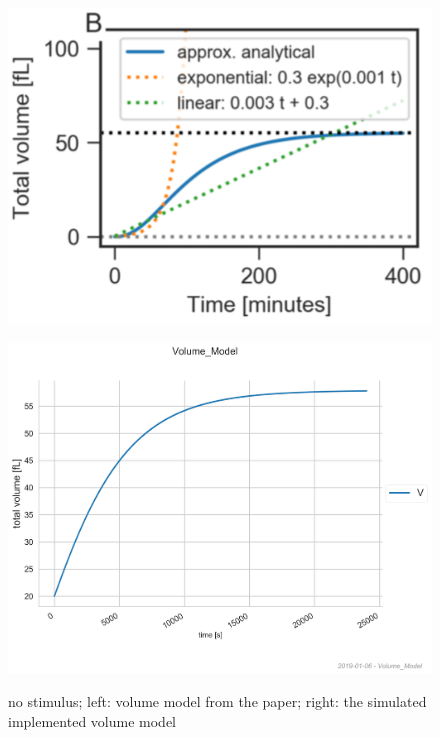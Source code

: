 \begin{figure}[htbp]
	
	\begin{minipage}{0,5\textwidth}
		
		\includegraphics[width=\textwidth]{picture/Volume_Paper.png}
		
		\label{volumePaper} 
	\end{minipage}
	\begin{minipage}{0,5\textwidth}
		
		\includegraphics[width=\textwidth]{picture/volume_examine.png}
		
		\label{volumeImplemented} 
	\end{minipage}
	\caption{no stimulus; left: volume model from the paper; right: the simulated implemented volume model}
\end{figure}


